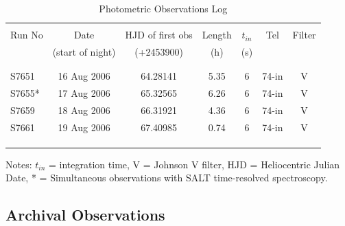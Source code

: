 \begin{table}
\caption[Photometric Observations Log]{Photometric Observations Log}
\begin{small}
\centering
\begin{tabular}{lcccccc}
\hline\hline\\ Run No & Date            & HJD of first obs & Length & $t_{in}$ & Tel & Filter \\ 
        &(start of night) &     (+2453900)   &    (h)   & (s) &       & \\\\ \hline  \\
 S7651  & 16 Aug 2006     &    64.28141      &  5.35    & 6  & 74-in & V \\ 
 S7655* & 17 Aug 2006     &    65.32565      &  6.26    & 6  & 74-in & V \\  
 S7659  & 18 Aug 2006     &    66.31921      &  4.36    & 6  & 74-in & V \\ 
 S7661  & 19 Aug 2006     &    67.40985      &  0.74    & 6  & 74-in & V \\\\ \hline \\\\

\end{tabular}
Notes: $t_{in}$ = integration time, V = Johnson V filter, HJD = Heliocentric Julian Date, * = Simultaneous observations with SALT time-resolved spectroscopy.



\end{small}

\label{obslog}
\end{table}







\subsection{Archival Observations}
\label{obs_archive}

